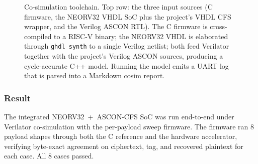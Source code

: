 \documentclass[11pt,a4paper]{article}
\begin{document}
\begin{figure}[H]
\caption{Co-simulation toolchain. Top row: the three input sources (C
firmware, the NEORV32 VHDL SoC plus the project's VHDL CFS wrapper, and
the Verilog ASCON RTL). The C firmware is cross-compiled to a RISC-V
binary; the NEORV32 VHDL is elaborated through \texttt{ghdl synth} to a
single Verilog netlist; both feed Verilator together with the
project's Verilog ASCON sources, producing a cycle-accurate C++
model. Running the model emits a UART log that is parsed into a
Markdown cosim report.}
\label{fig:cosim-flow}
\end{figure}

\subsubsection{Result}

The integrated NEORV32~+~ASCON-CFS SoC was run end-to-end under
Verilator co-simulation with the per-payload sweep firmware. The
firmware ran $8$ payload shapes through both the C reference and the
hardware accelerator, verifying byte-exact agreement on ciphertext,
tag, and recovered plaintext for each case. All $8$ cases passed.
\end{document}
